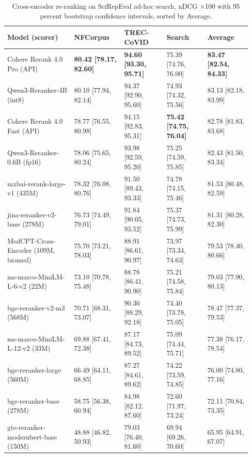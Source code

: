\begin{table}[H]
\caption{Cross-encoder re-ranking on SciRepEval ad-hoc search, nDCG $\times$100 with 95 percent bootstrap confidence intervals, sorted by Average.}
\label{tab:xenc-results}
\centering
\scriptsize
\setlength{\tabcolsep}{4pt}
\begin{tabular}{@{}p{3.2cm}llll@{}}
\toprule
Model (scorer) & NFCorpus & TREC-CoVID & Search & Average \\
\midrule
Cohere Rerank 4.0 Pro (API) & \textbf{80.42 [78.17, 82.60]} & \textbf{94.60 [93.30, 95.71]} & 75.39 [74.76, 76.00] & \textbf{83.47 [82.54, 84.33]} \\
Qwen3-Reranker-4B (int8) & 80.10 [77.94, 82.14] & 94.37 [92.90, 95.60] & 74.93 [74.32, 75.56] & 83.13 [82.18, 83.99] \\
Cohere Rerank 4.0 Fast (API) & 78.77 [76.55, 80.98] & 94.15 [92.83, 95.31] & \textbf{75.42 [74.75, 76.04]} & 82.78 [81.83, 83.68] \\
Qwen3-Reranker-0.6B (fp16) & 78.06 [75.65, 80.24] & 93.98 [92.59, 95.20] & 75.25 [74.59, 75.85] & 82.43 [81.50, 83.34] \\
mxbai-rerank-large-v1 (435M) & 78.32 [76.08, 80.76] & 91.50 [89.43, 93.33] & 74.78 [74.15, 75.46] & 81.53 [80.48, 82.59] \\
jina-reranker-v2-base (278M) & 76.73 [74.49, 79.01] & 91.84 [90.05, 93.52] & 75.37 [74.73, 75.99] & 81.31 [80.28, 82.30] \\
MedCPT-Cross-Encoder (109M, biomed) & 75.70 [73.21, 78.03] & 88.91 [86.61, 90.97] & 73.97 [73.34, 74.63] & 79.53 [78.40, 80.66] \\
ms-marco-MiniLM-L-6-v2 (22M) & 73.10 [70.78, 75.48] & 88.78 [86.41, 90.90] & 75.21 [74.58, 75.84] & 79.03 [77.90, 80.13] \\
bge-reranker-v2-m3 (568M) & 70.71 [68.31, 73.07] & 90.30 [88.29, 92.18] & 74.40 [73.78, 75.05] & 78.47 [77.37, 79.53] \\
ms-marco-MiniLM-L-12-v2 (33M) & 69.88 [67.41, 72.38] & 87.17 [84.73, 89.52] & 75.09 [74.44, 75.71] & 77.38 [76.17, 78.54] \\
bge-reranker-large (560M) & 66.49 [64.11, 68.85] & 87.27 [84.61, 89.62] & 74.22 [73.59, 74.85] & 76.00 [74.80, 77.16] \\
bge-reranker-base (278M) & 58.75 [56.38, 60.94] & 84.98 [82.12, 87.60] & 72.60 [71.97, 73.24] & 72.11 [70.84, 73.35] \\
gte-reranker-modernbert-base (150M) & 48.88 [46.82, 50.93] & 79.03 [76.40, 81.60] & 69.94 [69.26, 70.60] & 65.95 [64.91, 67.07] \\
\bottomrule
\end{tabular}


\end{table}
